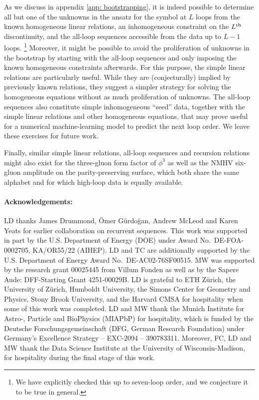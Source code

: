 \documentclass[12pt]{article}
\begin{document}
As we discuss in appendix \ref{app: bootstrapping}, it is indeed possible to determine all but one of the unknowns in the ansatz for the symbol at $L$ loops from the known homogeneous linear relations, an inhomogeneous constraint on the $L^{\rm th}$ discontinuity, and the all-loop sequences accessible from the data up to $L-1$ loops.%
\footnote{We have explicitly checked this up to seven-loop order, and we conjecture it to be true in general.}
Moreover, it might be possible to avoid the proliferation of unknowns in the bootstrap by starting with the all-loop sequences and only imposing the known homogeneous constraints afterwards.
For this purpose, the simple linear relations are particularly useful. While they are (conjecturally) implied by previously known relations, they suggest a simpler strategy for solving the homogeneous equations without as much proliferation of unknowns.  The all-loop sequences also constitute simple inhomogeneous ``seed'' data, together with the simple linear relations and other homogeneous equations, that may prove useful for a numerical machine-learning model to predict the next loop order.  We leave these exercises for future work.

Finally, similar simple linear relations, all-loop sequences and recursion relations might also exist for the three-gluon form factor of $\phi^3$ \citep{Basso:2024hlx,Henn:2024pki} as well as the NMHV six-gluon amplitude \citep{Caron-Huot:2019vjl} on the parity-preserving surface, which both share the same alphabet and for which high-loop data is equally available.


\paragraph{Acknowledgements:}
LD thanks James Drummond, \"{O}mer G\"urdo\u{g}an, Andrew McLeod and Karen Yeats for earlier collaboration on recurrent sequences.  
This work was supported in part by the U.S. Department of Energy (DOE) under Award No.~DE-FOA-0002705, KA/OR55/22 (AIHEP). 
LD and TC are additionally supported by the U.S. Department of Energy Award No.~DE-AC02-76SF00515. MW was supported by the research grant 00025445 from Villum Fonden as well as by the Sapere Aude: DFF-Starting Grant 4251-00029B. 
LD is grateful to ETH Z\"urich, the University of Z\"urich, Humboldt University, the Simons Center for Geometry and Physics, Stony Brook University, and the Harvard CMSA for hospitality when some of this work was completed.
LD and MW thank the Munich Institute for Astro-, Particle and BioPhysics (MIAPbP) for hospitality, which is funded by the Deutsche Forschungsgemeinschaft (DFG, German Research Foundation) under Germany's Excellence Strategy – EXC-2094 – 390783311.
Moreover, FC, LD and MW thank the Data Science Institute at the University of Wisconsin-Madison, for hospitality during the final stage of this work.
\end{document}
